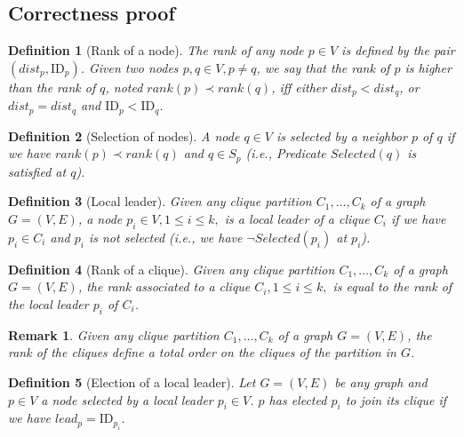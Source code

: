 \documentclass[11pt,letterpaper,onecolumn]{article}
\newtheorem{definition}{Definition}
\newtheorem{rem}{Remark}
\newcommand{\id}{\mbox{ID}}
\begin{document}
\subsection{Correctness proof}

\begin{definition}[Rank of a node]
The \emph{rank} of any node $p \in V$ is defined by the pair $(dist_p, \id_p)$. Given two nodes $p, q \in V, p \neq q$, we say that the rank of $p$ is higher than the rank of $q$, noted $rank(p) \prec rank(q)$, iff either $dist_p<dist_q$, or $dist_p=dist_q$ and $\id_p<\id_q$.
\end{definition}

\begin{definition}[Selection of nodes]
A node $q \in V$ is \emph{selected} by a neighbor $p$ of $q$ if we have $rank(p) \prec rank(q)$ and $q \in S_p$ (i.e., Predicate $Selected(q)$ is satisfied at $q$).
\end{definition}

\begin{definition}[Local leader]
\label{def:local_leader}
Given any clique partition $C_1, \dots, C_k$ of a graph $G=(V,E)$, a node $p_i \in V, 1 \leq i \leq k,$ is a \emph{local leader} of a clique $C_i$ if we have $p_i \in C_i$ and $p_i$ is not selected (i.e., we have $\neg Selected(p_i)$ at $p_i$).
\end{definition}

\begin{definition}[Rank of a clique]
Given any clique partition $C_1, \dots, C_k$ of a graph $G=(V,E)$, the rank associated to a clique $C_i, 1 \leq i \leq k,$ is equal to the rank of the local leader $p_i$ of $C_i$.
\end{definition}

\begin{rem}
\label{rem:total_order_clique}
Given any clique partition $C_1, \dots, C_k$ of a graph $G=(V,E)$, the rank of the cliques define a total order on the cliques of the partition in $G$.
\end{rem}

\begin{definition}[Election of a local leader]
Let $G=(V,E)$ be any graph and $p \in V$ a node selected by a local leader $p_i \in V$. $p$ has \emph{elected} $p_i$ to join its clique if we have $lead_p=\id_{p_i}$.
\end{definition}
\end{document}
